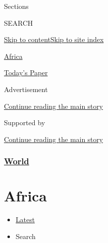 Sections

SEARCH

\protect\hyperlink{site-content}{Skip to
content}\protect\hyperlink{site-index}{Skip to site index}

\href{https://www.nytimes.com/section/world/africa}{Africa}

\href{https://myaccount.nytimes.com/auth/login?response_type=cookie\&client_id=vi}{}

\href{https://www.nytimes.com/section/todayspaper}{Today's Paper}

Advertisement

\protect\hyperlink{after-top}{Continue reading the main story}

Supported by

\protect\hyperlink{after-sponsor}{Continue reading the main story}

\hypertarget{world}{%
\subsubsection{\texorpdfstring{\href{/section/world}{World}}{World}}\label{world}}

\hypertarget{africa}{%
\section{Africa}\label{africa}}

\begin{itemize}
\tightlist
\item
  \protect\hyperlink{stream-panel}{Latest}
\item
  Search
\end{itemize}

